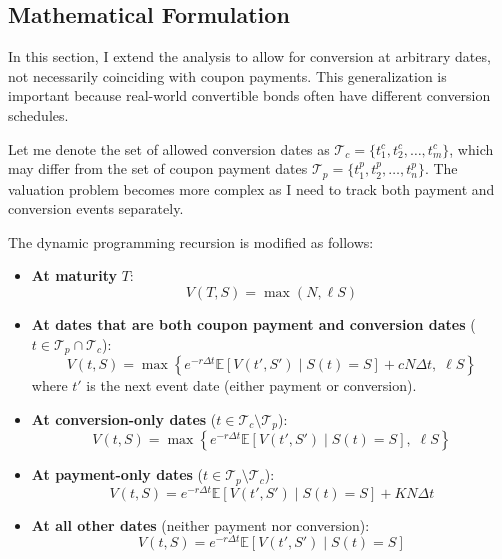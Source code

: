 \subsection{Mathematical Formulation}

In this section, I extend the analysis to allow for conversion at arbitrary dates, not necessarily coinciding with coupon payments. This generalization is important because real-world convertible bonds often have different conversion schedules.

Let me denote the set of allowed conversion dates as $\mathcal{T}_c = \{t_1^c, t_2^c, \ldots, t_m^c\}$, which may differ from the set of coupon payment dates $\mathcal{T}_p = \{t_1^p, t_2^p, \ldots, t_n^p\}$. The valuation problem becomes more complex as I need to track both payment and conversion events separately.

The dynamic programming recursion is modified as follows:

\begin{itemize}
    \item \textbf{At maturity} $T$:
    \begin{equation}
        V(T, S) = \max\left( N, \ell S \right)
    \end{equation}
    
    \item \textbf{At dates that are both coupon payment and conversion dates} ($t \in \mathcal{T}_p \cap \mathcal{T}_c$):
    \begin{equation}
        V(t, S) = \max \left\{
            e^{-r \Delta t} \mathbb{E} \left[ V(t', S') \mid S(t) = S \right] + c N \Delta t, \;
            \ell S
        \right\}
    \end{equation}
    where $t'$ is the next event date (either payment or conversion).
    
    \item \textbf{At conversion-only dates} ($t \in \mathcal{T}_c \setminus \mathcal{T}_p$):
    \begin{equation}
        V(t, S) = \max \left\{
            e^{-r \Delta t} \mathbb{E} \left[ V(t', S') \mid S(t) = S \right], \;
            \ell S
        \right\}
    \end{equation}
    
    \item \textbf{At payment-only dates} ($t \in \mathcal{T}_p \setminus \mathcal{T}_c$):
    \begin{equation}
        V(t, S) = e^{-r \Delta t} \mathbb{E} \left[ V(t', S') \mid S(t) = S \right] + K N \Delta t
    \end{equation}
    
    \item \textbf{At all other dates} (neither payment nor conversion):
    \begin{equation}
        V(t, S) = e^{-r \Delta t} \mathbb{E} \left[ V(t', S') \mid S(t) = S \right]
    \end{equation}
\end{itemize}

